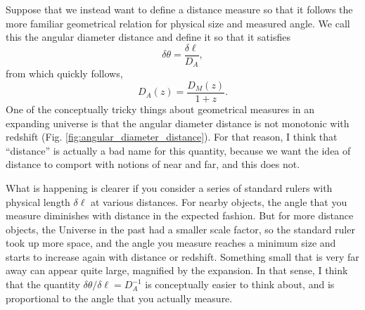    Suppose that we instead want to define a distance measure so that it follows the more familiar geometrical relation for physical size and measured angle.  We call this the angular diameter distance and define it so that it satisfies
\begin{equation}
  \delta\theta = \frac{\delta\ell}{D_A},
\end{equation}
from which quickly follows,
\begin{equation}
  D_A(z) = \frac{D_M(z)}{1+z}.
\end{equation}
One of the conceptually tricky things about geometrical measures in an expanding universe is that the angular diameter distance is not monotonic with redshift (Fig. \ref{fig:angular_diameter_distance}).  For that reason, I think that ``distance'' is actually a bad name for this quantity, because we want the idea of distance to comport with notions of near and far, and this does not.

What is happening is clearer if you consider a series of standard rulers with physical length $\delta\ell$ at various distances.  For nearby objects, the angle that you measure diminishes with distance in the expected fashion.  But for more distance objects, the Universe in the past had a smaller scale factor, so the standard ruler took up more space, and the angle you measure reaches a minimum size and starts to increase again with distance or redshift.  Something small that is very far away can appear quite large, magnified by the expansion.  In that sense, I think that the quantity $\delta\theta/\delta\ell = D_A^{-1}$ is conceptually easier to think about, and is proportional to the angle that you actually measure.


